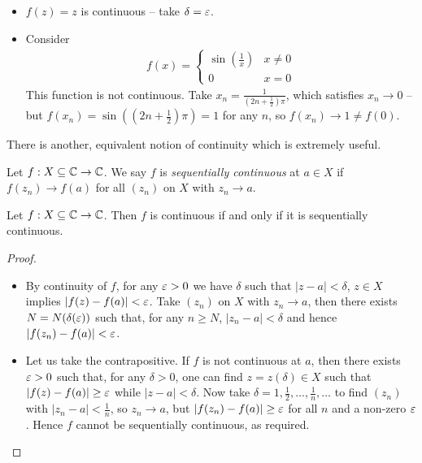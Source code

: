 \documentclass{../template/note}
\begin{document}
    \begin{example}
        \begin{itemize}
            \item \(f(z) = z\) is continuous -- take \(\delta = \varepsilon\).
            \item Consider \begin{align*}
                f(x) = \begin{cases}
                    \sin\left(\frac 1 x\right) & x \neq 0 \\
                    0 & x = 0
                \end{cases}
            \end{align*}
            This function is not continuous. Take \(x_n = \frac{1}{(2n+\frac 1 2)\pi}\), which satisfies \(x_n \to 0\) -- but \(f(x_n) = \sin\left(\left(2n+\frac 1 2\right)\pi\right) = 1\) for any \(n\), so \(f(x_n) \to 1 \neq f(0)\).
        \end{itemize}
    \end{example}
    
    
    There is another, equivalent notion of continuity which is extremely useful.

    \begin{definition}
        Let \(f: X \subseteq \mathbb C \to \mathbb C\). We say \(f\) is \emph{sequentially continuous} at \(a \in X\) if \(f(z_n) \to f(a)\) for all \((z_n)\) on \(X\) with \(z_n \to a\).
    \end{definition}
    
    \begin{proposition}
        Let \(f: X \subseteq \mathbb C \to \mathbb C\). Then \(f\) is continuous if and only if it is sequentially continuous.
    \end{proposition}
    
    \begin{proof}
        \begin{itemize}
            \item[\(\implies\)] By continuity of \(f\), for any \(\varepsilon > 0\) we have \(\delta\) such that \(|z-a| < \delta\), \(z \in X\) implies \(|f(z) - f(a)| < \varepsilon\). Take \((z_n)\) on \(X\) with \(z_n \to a\), then there exists \(N = N(\delta(\varepsilon))\) such that, for any \(n \geq N\), \(|z_n-a| < \delta\) and hence \(|f(z_n)-f(a)| < \varepsilon\).
            \item[\(\impliedby\)] Let us take the contrapositive. If \(f\) is not continuous at \(a\), then there exists \(\varepsilon > 0\) such that, for any \(\delta > 0\), one can find \(z = z(\delta) \in X\) such that \(|f(z)-f(a)| \geq \varepsilon\) while \(|z-a| < \delta\). Now take \(\delta = 1, \frac 1 2, \dots, \frac 1 n, \dots\) to find \((z_n)\) with \(|z_n-a| < \frac 1 n\), so \(z_n \to a\), but \(|f(z_n)-f(a)| \geq \varepsilon\) for all \(n\) and a non-zero \(\varepsilon\). Hence \(f\) cannot be sequentially continuous, as required.
        \end{itemize}
    \end{proof}
    
\end{document}
